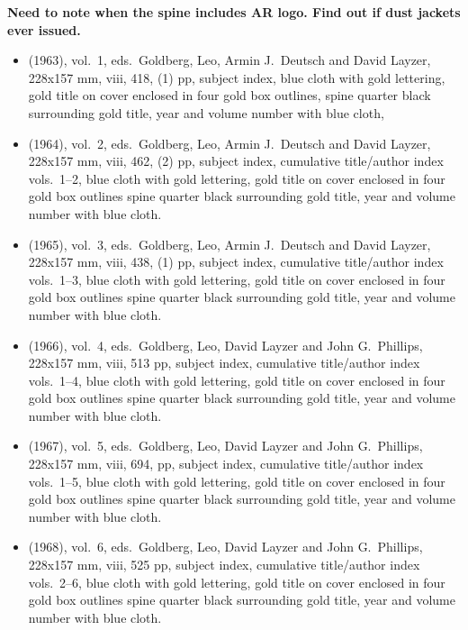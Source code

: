 \textbf{Need to note when the spine includes AR logo. Find out if dust jackets ever issued.}

\begin{itemize}
	\item (1963), vol.\ 1, eds.\ Goldberg, Leo, Armin J.\ Deutsch and David Layzer, 228x157 mm,
	viii, 418, (1) pp, subject index,
	blue cloth with gold lettering, gold title on cover enclosed in	four gold box outlines,
	spine quarter black surrounding gold title, year and volume number with blue cloth,
	
	\item (1964), vol.\ 2, eds.\ Goldberg, Leo, Armin J.\ Deutsch and David Layzer, 228x157 mm,
	viii, 462, (2) pp, subject index, cumulative title/author index vols.\ 1--2,
	blue cloth with gold lettering, gold title on cover enclosed in four gold box outlines
  spine quarter black surrounding gold title, year and volume number with blue cloth.
	
	\item (1965), vol.\ 3, eds.\ Goldberg, Leo, Armin J.\ Deutsch and David Layzer, 228x157 mm,
	viii, 438, (1) pp, subject index, cumulative title/author index vols.\ 1--3,
	blue cloth with gold lettering, gold title on cover enclosed in four gold box outlines
  spine quarter black surrounding gold title, year and volume number with blue cloth.
	
	\item (1966), vol.\ 4, eds.\ Goldberg, Leo, David Layzer and John G.\ Phillips, 228x157 mm,
	viii, 513 pp, subject index, cumulative title/author index vols.\ 1--4,
	blue cloth with gold lettering, gold title on cover enclosed in four gold box outlines
  spine quarter black surrounding gold title, year and volume number with blue cloth.
	
	\item (1967), vol.\ 5, eds.\ Goldberg, Leo, David Layzer and John G.\ Phillips, 228x157 mm,
	viii, 694, pp, subject index, cumulative title/author index vols.\ 1--5,
	blue cloth with gold lettering, gold title on cover enclosed in four gold box outlines
  spine quarter black surrounding gold title, year and volume number with blue cloth.
	
	\item (1968), vol.\ 6, eds.\ Goldberg, Leo, David Layzer and John G.\ Phillips, 228x157 mm,
	viii, 525 pp, subject index, cumulative title/author index vols.\ 2--6,
	blue cloth with gold lettering, gold title on cover enclosed in four gold box outlines
  spine quarter black surrounding gold title, year and volume number with blue cloth.
	

\end{itemize}
